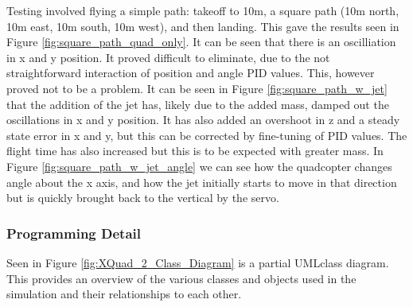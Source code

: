 \documentclass[11pt]{article}
\begin{document}
Testing involved flying a simple path: takeoff to 10m, a square path (10m north, 10m east, 10m south, 10m west), and then landing. This gave the results seen in Figure \ref{fig:square_path_quad_only}. It can be seen that there is an oscilliation in x and y position. It proved difficult to eliminate, due to the not straightforward interaction of position and angle PID values. This, however proved not to be a problem. It can be seen in Figure \ref{fig:square_path_w_jet} that the addition of the jet has, likely due to the added mass, damped out the oscillations in x and y position. It has also added an overshoot in z and a steady state error in x and y, but this can be corrected by fine-tuning of PID values. The flight time has also increased but this is to be expected with greater mass. In Figure \ref{fig:square_path_w_jet_angle} we can see how the quadcopter changes angle about the x axis, and how the jet initially starts to move in that direction but is quickly brought back to the vertical by the servo.

\subsubsection{Programming Detail}
Seen in Figure \ref{fig:XQuad_2_Class_Diagram}
is a partial UML\footnotemark class diagram. This provides an overview of the various classes and objects used in the simulation and their relationships to each other.
\end{document}

